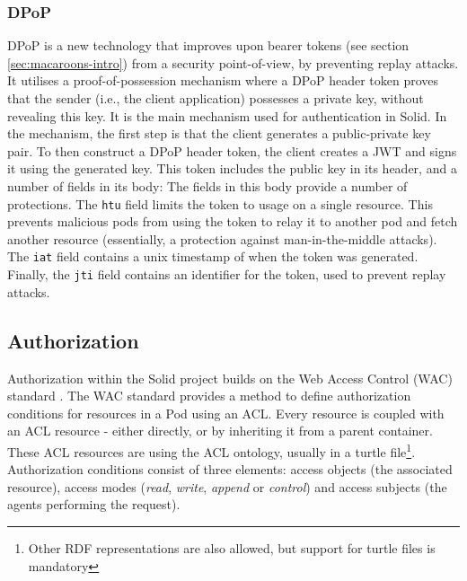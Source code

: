 \subsubsection{DPoP}
\label{sec:dpop}
\acrfull{DPoP} \citep{ietf-oauth-dpop} is a new technology that improves upon bearer tokens (see section \ref{sec:macaroons-intro}) from a security point-of-view, by preventing replay attacks. It utilises a proof-of-possession mechanism where a \gls{DPoP} header token proves that the sender (i.e., the client application) possesses a private key, without revealing this key. It is the main mechanism used for authentication in Solid. In the mechanism, the first step is that the client generates a public-private key pair. To then construct a \gls{DPoP} header token, the client creates a \gls{JWT} and signs it using the generated key. This token includes the public key in its header, and a number of fields in its body:
{}
\noindent The fields in this body provide a number of protections. The \texttt{htu} field limits the token to usage on a single resource. This prevents malicious pods from using the token to relay it to another pod and fetch another resource (essentially, a protection against man-in-the-middle attacks). The \texttt{iat} field contains a unix timestamp of when the token was generated. Finally, the \texttt{jti} field contains an identifier for the token, used to prevent replay attacks.

\subsection{Authorization}
Authorization within the Solid project builds on the Web Access Control (WAC) standard \citep{wac}. The WAC standard provides a method to define authorization conditions for resources in a Pod using an \gls{ACL}. Every resource is coupled with an \gls{ACL} resource - either directly, or by inheriting it from a parent container. These \gls{ACL} resources are using the \gls{ACL} ontology, usually in a turtle file\footnote{Other \gls{RDF} representations are also allowed, but support for turtle files is mandatory}. Authorization conditions consist of three elements: access objects (the associated resource), access modes (\textit{read}, \textit{write}, \textit{append} or \textit{control}) and access subjects (the agents performing the request).

